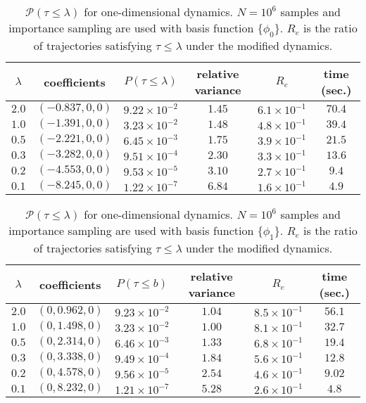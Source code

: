 \documentclass[final]{siamltex}
\begin{document}
\begin{table}
\centering
  \begin{tabular}{c|c|c|c|c|c}
    \hline
   $\lambda$ & coefficients & $P(\tau \le \lambda)$ & relative variance & $R_e$ & time (sec.) \\
    \hline
  $2.0$ & $(-0.837, 0, 0)$ & $9.22 \times 10^{-2}$ & $1.45$ & $6.1 \times 10^{-1}$ & $70.4$ \\
    \hline
    $1.0$ & $(-1.391, 0, 0)$ & $3.23 \times 10^{-2}$ & $1.48$ & $4.8 \times 10^{-1}$ & $39.4$ \\
    \hline
    $0.5$ & $(-2.221, 0, 0)$ & $6.45 \times 10^{-3}$ & $1.75$ & $3.9 \times 10^{-1}$ & $21.5$ \\
    \hline
    $0.3$ & $(-3.282, 0, 0)$ & $9.51 \times 10^{-4}$ & $2.30$ & $3.3 \times 10^{-1}$ & $13.6$ \\
    \hline
    $0.2$ & $(-4.553, 0, 0)$ & $9.53 \times 10^{-5}$ & $3.10$ & $2.7 \times 10^{-1}$ & $9.4$ \\
    \hline
    $0.1$ & $(-8.245, 0, 0)$ & $1.22 \times 10^{-7}$ & $6.84$ & $1.6 \times
 10^{-1}$ & $4.9$ \\
    \hline
  \end{tabular}
  \caption{ $\mathcal{P}(\tau \le \lambda)$ for one-dimensional dynamics.
  $N=10^6$ samples and importance sampling are used with basis function $\{\phi_0\}$. $R_e$ is the
ratio of trajectories satisfying $\tau \le \lambda$ under the modified dynamics. \label{tab-ex1-2}}
\end{table}
\begin{table}
  \centering
  \begin{tabular}{c|c|c|c|c|c}
    \hline
    $\lambda$ & coefficients & $P(\tau \le b)$ & relative variance & $R_e$ & time (sec.) \\
    \hline
  $2.0$ & $(0, 0.962, 0)$ & $9.23 \times 10^{-2}$ & $1.04$ & $8.5 \times 10^{-1}$ & $56.1$\\
    \hline
  $1.0$ & $(0, 1.498, 0)$ & $3.23 \times 10^{-2}$ & $1.00$ & $8.1 \times 10^{-1}$ & $32.7$ \\
    \hline
  $0.5$ & $(0, 2.314, 0)$ & $6.46 \times 10^{-3}$ & $1.33$ & $6.8 \times 10^{-1}$ & $19.4$ \\
    \hline
  $0.3$ & $(0, 3.338, 0)$ & $9.49 \times 10^{-4}$ & $1.84$ & $5.6 \times 10^{-1}$ & $12.8$ \\
    \hline
  $0.2$ & $(0, 4.578, 0)$ & $9.56 \times 10^{-5}$ & $2.54$ & $4.6 \times 10^{-1}$ & $9.02$\\
    \hline
  $0.1$ & $(0, 8.232, 0)$ & $1.21 \times 10^{-7}$ & $5.28$ & $2.6 \times 10^{-1}$ & $4.8$\\
    \hline
  \end{tabular}
  \caption{ $\mathcal{P}(\tau \le \lambda)$ for one-dimensional dynamics.
  $N=10^6$ samples and importance sampling are used with basis function $\{\phi_1\}$. $R_e$ is the ratio of trajectories satisfying $\tau \le \lambda$ under the modified dynamics. \label{tab-ex1-3}}
\end{table}
\end{document}
